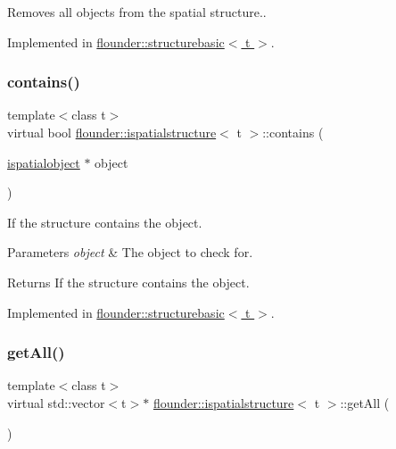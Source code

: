 Removes all objects from the spatial structure.. 



Implemented in \hyperlink{classflounder_1_1structurebasic_a080579359485a5b32489a004c70da095}{flounder\+::structurebasic$<$ t $>$}.

\mbox{\label{classflounder_1_1ispatialstructure_a80e36c5dca0995c27d7222e3c3fc1b90}} 
\subsubsection{\texorpdfstring{contains()}{contains()}}
{\footnotesize\ttfamily template$<$class t$>$ \\
virtual bool \hyperlink{classflounder_1_1ispatialstructure}{flounder\+::ispatialstructure}$<$ t $>$\+::contains (\begin{DoxyParamCaption}\item[{\hyperlink{classflounder_1_1ispatialobject}{ispatialobject} $\ast$}]{object }\end{DoxyParamCaption})\hspace{0.3cm}{\ttfamily [pure virtual]}}



If the structure contains the object. 


\begin{DoxyParams}{Parameters}
{\em object} & The object to check for. \\
\hline
\end{DoxyParams}
\begin{DoxyReturn}{Returns}
If the structure contains the object. 
\end{DoxyReturn}


Implemented in \hyperlink{classflounder_1_1structurebasic_ac9a9bcd40d564056c33c2ade540f4e4c}{flounder\+::structurebasic$<$ t $>$}.

\mbox{\label{classflounder_1_1ispatialstructure_a481b04135e2ed57ab8f29d09301dce7e}} 
\subsubsection{\texorpdfstring{get\+All()}{getAll()}\hspace{0.1cm}{\footnotesize\ttfamily [1/2]}}
{\footnotesize\ttfamily template$<$class t$>$ \\
virtual std\+::vector$<$t$>$$\ast$ \hyperlink{classflounder_1_1ispatialstructure}{flounder\+::ispatialstructure}$<$ t $>$\+::get\+All (\begin{DoxyParamCaption}{ }\end{DoxyParamCaption})\hspace{0.3cm}{\ttfamily [pure virtual]}}



